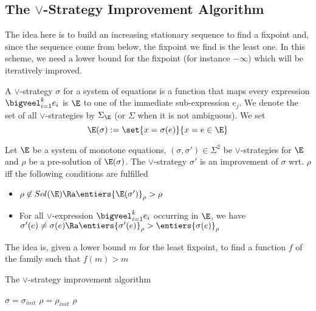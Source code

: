 \documentclass[a4paper, twoside, 10pt]{article}
\begin{document}
\subsection{The \texorpdfstring{$\vee$}{Max}-Strategy Improvement Algorithm}

The idea here is to build an increasing stationary sequence to find a fixpoint and, since the sequence come from below, the fixpoint we find is the least one. In this scheme, we need a lower bound for the fixpoint (for instance $-\infty$) which will be iteratively improved.

A $\vee$-strategy $\sigma$ for a system of equations is a function that maps every expression $\bigveel_{i=1}^k e_i$ is $\E$ to one of the immediate sub-expression $e_j$. We denote the set of all $\vee$-strategies by $\Sigma_\E$ (or $\Sigma$ when it is not ambiguous). We set
\[
    \E(\sigma) := \set{x = \sigma(e)}{x=e\in\E}
\]

\begin{definition}
    Let $\E$ be a system of monotone equations, $(\sigma, \sigma')\in\Sigma^2$ be $\vee$-strategies for $\E$ and $\rho$ be a pre-solution of $\E(\sigma)$. The $\vee$-strategy $\sigma'$ is an improvement of $\sigma$ wrt. $\rho$ iff the following conditions are fulfilled
    \begin{itemize}
        \item $\rho \not\in \mathop{Sol}(\E) \Ra \entiers{\E(\sigma')}_\rho > \rho$
        \item For all $\vee$-expression $\bigveel_{i=1}^k e_i$ occurring in $\E$, we have $\sigma'(e) \neq \sigma(e) \Ra \entiers{\sigma'(e)}_\rho > \entiers{\sigma(e)}_\rho$
    \end{itemize}
\end{definition}

The idea is, given a lower bound $m$ for the least fixpoint, to find a function $f$ of the family such that $f(m) > m$

\begin{algorithm}
    \caption{The $\vee$-strategy improvement algorithm}
    \DontPrintSemicolon
    $\sigma = \sigma_{init}$\;
    $\rho = \rho_{init}$\;
    \Return $\rho$
\end{algorithm}
\end{document}
